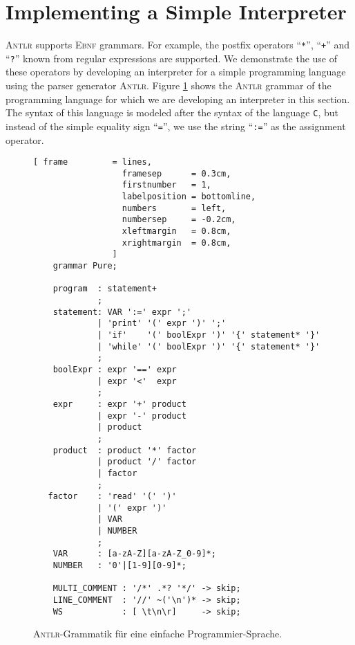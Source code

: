 \section{Implementing a Simple Interpreter  \label{chapter:interpreter}}

\textsc{Antlr} supports \textsc{Ebnf} grammars. For example, the postfix operators
``\texttt{*}'', ``\texttt{+}'' and ``\texttt{?}'' known from regular expressions are
supported. We demonstrate the use of these operators by developing an interpreter for a
simple programming language using the parser generator \textsc{Antlr}. Figure
\ref{fig:Pure.g4} shows the \textsc{Antlr} grammar of the programming language for which
we are developing an interpreter in this section. The syntax of this language is modeled
after the syntax of the language \texttt{C}, but instead of the simple equality sign
``\texttt{=}'', we use the string ``\texttt{:=}'' as the assignment operator.

\begin{figure}[!ht]
\centering
\begin{Verbatim}[ frame         = lines, 
                  framesep      = 0.3cm, 
                  firstnumber   = 1,
                  labelposition = bottomline,
                  numbers       = left,
                  numbersep     = -0.2cm,
                  xleftmargin   = 0.8cm,
                  xrightmargin  = 0.8cm,
                ]
    grammar Pure;
    
    program  : statement+
             ;  
    statement: VAR ':=' expr ';'
             | 'print' '(' expr ')' ';'
             | 'if'    '(' boolExpr ')' '{' statement* '}'
             | 'while' '(' boolExpr ')' '{' statement* '}'
             ;
    boolExpr : expr '==' expr
             | expr '<'  expr
             ;
    expr     : expr '+' product
             | expr '-' product
             | product
             ;
    product  : product '*' factor
             | product '/' factor
             | factor
             ;
   factor    : 'read' '(' ')' 
             | '(' expr ')'
             | VAR
             | NUMBER
             ;
    VAR      : [a-zA-Z][a-zA-Z_0-9]*;
    NUMBER   : '0'|[1-9][0-9]*;
    
    MULTI_COMMENT : '/*' .*? '*/' -> skip;
    LINE_COMMENT  : '//' ~('\n')* -> skip;
    WS            : [ \t\n\r]     -> skip; 
\end{Verbatim}
\vspace*{-0.3cm}
\caption{\textsc{Antlr}-Grammatik f\"ur eine einfache Programmier-Sprache.}
\label{fig:Pure.g4}
\end{figure}

